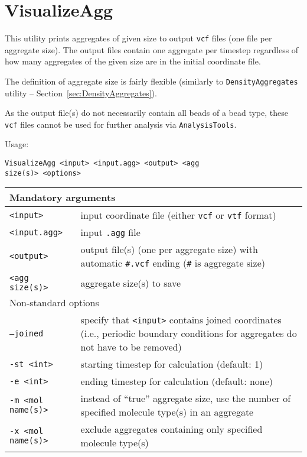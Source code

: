 \section{VisualizeAgg} \label{sec:VisualizeAgg}

This utility prints aggregates of given size to output \texttt{vcf} files
(one file per aggregate size). The output files contain one aggregate per
timestep regardless of how many aggregates of the given size are in the
initial coordinate file.

The definition of aggregate size is fairly flexible (similarly to
\texttt{DensityAggregates} utility -- Section~\ref{sec:DensityAggregates}).

As the output file(s) do not necessarily contain all beads of a bead
type, these \texttt{vcf} files cannot be used for further analysis via
\texttt{AnalysisTools}.

Usage:

\vspace{1em}
\noindent
\texttt{VisualizeAgg <input> <input.agg> <output> <agg \\
size(s)> <options>}

\noindent
\begin{longtable}{p{}p{}}
  \toprule
  \multicolumn{2}{l}{Mandatory arguments} \\
  \midrule
  \texttt{<input>} & input coordinate file (either \texttt{vcf} or
    \texttt{vtf} format) \\
  \texttt{<input.agg>} & input \texttt{.agg} file \\
  \texttt{<output>} & output file(s) (one per aggregate size) with
    automatic \texttt{\#.vcf} ending (\texttt{\#} is aggregate size) \\
  \texttt{<agg size(s)>} & aggregate size(s) to save \\
  \toprule
  \multicolumn{2}{l}{Non-standard options} \\
  \midrule
  \texttt{--joined} & specify that \texttt{<input>} contains joined
    coordinates (i.e., periodic boundary conditions for aggregates do not
    have to be removed) \\
  \texttt{-st <int>} & starting timestep for calculation (default: 1) \\
  \texttt{-e <int>} & ending timestep for calculation (default: none) \\
  \texttt{-m <mol name(s)>} & instead of \enquote{true} aggregate size, use
    the number of specified molecule type(s) in an aggregate \\
  \texttt{-x <mol name(s)>} & exclude aggregates containing only specified
    molecule type(s) \\
  \bottomrule
\end{longtable}
